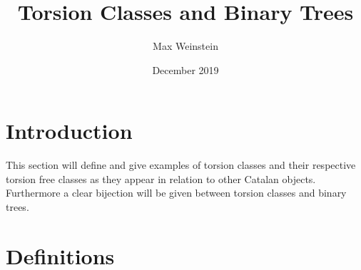 \documentclass{article}
\title{Torsion Classes and Binary Trees}
\author{Max Weinstein}
\date{December 2019}
\begin{document}
\maketitle

\newtheorem{thm}{Theorem}
\theoremstyle{definition}
\newtheorem{define}[thm]{Definition}


\section{Introduction}
This section will define and give examples of torsion classes and their respective torsion free classes as they appear in relation to other Catalan objects. Furthermore a clear bijection will be given between torsion classes and binary trees. 



\section{Definitions}
\end{document}
